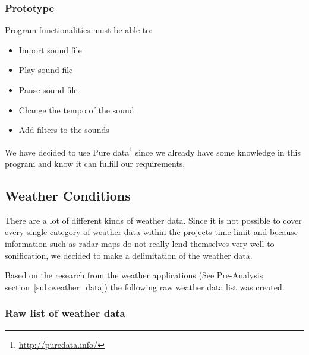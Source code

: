 \subsubsection{Prototype} %
\label{ssub:prototype}

Program functionalities must be able to:
\begin{itemize}
    \item Import sound file
    \item Play sound file
    \item Pause sound file
    \item Change the tempo of the sound
    \item Add filters to the sounds
\end{itemize}

We have decided to use Pure data\footnote{\url{http://puredata.info/}} since we already have some knowledge in this program and know it can fulfill our requirements. 




\subsection{Weather Conditions} %
\label{sub:weather_conditions}

There are a lot of different kinds of weather data. 
Since it is not possible to cover every single category of weather data within the projects time limit and because information such as radar maps do not really lend themselves very well to sonification, we decided to make a delimitation of the weather data.

Based on the research from the weather applications (See Pre-Analysis section~\ref{sub:weather_data}) the following raw weather data list was created.

\subsubsection*{Raw list of weather data} %
\label{ssub:raw_list_of_weather_data}

